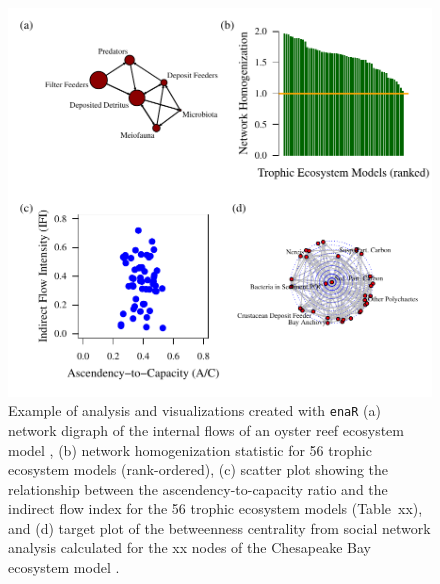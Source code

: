 \documentclass[11pt]{article}
\newcommand{\enaR}{\texttt{enaR}}
\begin{document}
\begin{figure}[h]
\includegraphics[scale=1]{../figures/enaR_plot_example.pdf}
\caption{Example of analysis and visualizations created with \enaR\:
  (a) network digraph of the internal flows of an oyster reef
  ecosystem model \citep{dame81}, (b) network homogenization statistic
  for 56 trophic ecosystem models (rank-ordered), (c) scatter plot
  showing the relationship between the ascendency-to-capacity ratio
  and the indirect flow index for the 56 trophic ecosystem models
  (Table~xx), and (d) target plot of the betweenness centrality from
  social network analysis calculated for the xx nodes of the
  Chesapeake Bay ecosystem model \citep{baird89}. } \label{fig:example}
\end{figure}
\end{document}
